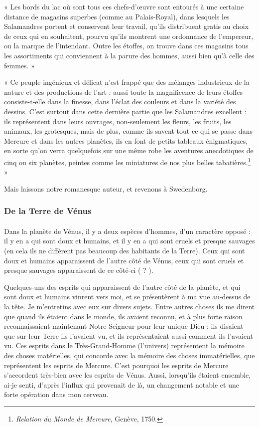 \documentclass[a4paper, 11pt, oneside, landscape]{article}
\begin{document}
« Les bords du lac où sont tous ces chefs-d'œuvre sont entourés à une certaine distance de magasins superbes (comme au Palais-Royal), dans lesquels les Salamandres portent et conservent leur travail, qu'ils distribuent gratis au choix de ceux qui en souhaitent, pourvu qu'ils montrent une ordonnance de l'empereur, ou la marque de l'intendant. Outre les étoffes, on trouve dans ces magasins tous les assortiments qui conviennent à la parure des hommes, aussi bien qu'à celle des femmes. »

« Ce peuple ingénieux et délicat n'est frappé que des mélanges industrieux de la nature et des productions de l'art : aussi toute la magnificence de leurs étoffes consiste-t-elle dans la finesse, dans l'éclat des couleurs et dans la variété des dessins. C'est surtout dans cette dernière partie que les Salamandres excellent : ils représentent dans leurs ouvrages, non-seulement les fleurs, les fruits, les animaux, les grotesques, mais de plus, comme ils savent tout ce qui se passe dans Mercure et dans les autres planètes, ils en font de petits tableaux énigmatiques, en sorte qu'on verra quelquefois sur une même robe les aventures anecdotiques de cinq ou six planètes, peintes comme les miniatures de nos plus belles tabatières.\footnote{\emph{Relation du Monde de Mercure}, Genève, 1750.} »

Mais laissons notre romanesque auteur, et revenons à Swedenborg.

\subsubsection{De la Terre de Vénus}
\paragraph{}
Dans la planète de Vénus, il y a deux espèces d'hommes, d'un caractère opposé : il y en a qui sont doux et humains, et il y en a qui sont cruels et presque sauvages (en cela ils ne diffèrent pas beaucoup des habitants de la Terre). Ceux qui sont doux et humains apparaissent de l'autre côté de Vénus, ceux qui sont cruels et presque sauvages apparaissent de ce côté-ci ( ? ).

Quelques-uns des esprits qui apparaissent de l'autre côté de la planète, et qui sont doux et humains vinrent vers moi, et se présentèrent à ma vue au-dessus de la tête. Je m'entretins avec eux sur divers sujets. Entre autres choses ils me dirent que quand ils étaient dans le monde, ils avaient reconnu, et à plus forte raison reconnaissaient maintenant Notre-Seigneur pour leur unique Dieu ; ils disaient que sur leur Terre ils l'avaient vu, et ils représentaient aussi comment ils l'avaient vu. Ces esprits dans le Très-Grand-Homme (l'univers) représentent la mémoire des choses matérielles, qui concorde avec la mémoire des choses immatérielles, que représentent les esprits de Mercure. C'est pourquoi les esprits de Mercure s'accordent très-bien avec les esprits de Vénus. Aussi, lorsqu'ils étaient ensemble, ai-je senti, d'après l'influx qui provenait de là, un changement notable et une forte opération dans mon cerveau.
\end{document}
